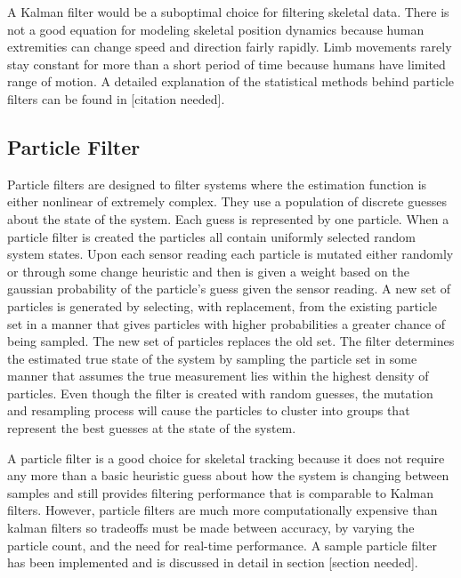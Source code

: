 A Kalman filter would be a suboptimal choice for filtering skeletal data. There is not a good equation for modeling skeletal position dynamics because human extremities can change speed and direction fairly rapidly. Limb movements rarely stay constant for more than a short period of time because humans have limited range of motion. A detailed explanation of the statistical methods behind particle filters can be found in [citation needed].

\subsection{Particle Filter}

Particle filters are designed to filter systems where the estimation function is either nonlinear of extremely complex. They use a population of discrete guesses about the state of the system. Each guess is represented by one particle. When a particle filter is created the particles all contain uniformly selected random system states. Upon each sensor reading each particle is mutated either randomly or through some change heuristic and then is given a weight based on the gaussian probability of the particle’s guess given the sensor reading. A new set of particles is generated by selecting, with replacement, from the existing particle set in a manner that gives particles with higher probabilities a greater chance of being sampled. The new set of particles replaces the old set. The filter determines the estimated true state of the system by sampling the particle set in some manner that assumes the true measurement lies within the highest density of particles. Even though the filter is created with random guesses, the mutation and resampling process will cause the particles to cluster into groups that represent the best guesses at the state of the system. 

A particle filter is a good choice for skeletal tracking because it does not require any more than a basic heuristic guess about how the system is changing between samples and still provides filtering performance that is comparable to  Kalman filters. However, particle filters are much more computationally expensive than kalman filters so tradeoffs must be made between accuracy, by varying the particle count, and the need for real-time performance. A sample particle filter has been implemented and is discussed in detail in section [section needed].